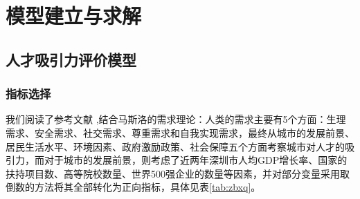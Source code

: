 \documentclass[withoutpreface,bwprint]{cumcmthesis} %
\newcommand{\upcite}[1]{\textsuperscript{\textsuperscript{\cite{#1}}}}
\begin{document}
\section{模型建立与求解}
\subsection{人才吸引力评价模型}
\subsubsection{指标选择}
我们阅读了参考文献\upcite{bib:1} ,结合马斯洛的需求理论：人类的需求主要有5个方面：生理需求、安全需求、社交需求、尊重需求和自我实现需求，最终从城市的发展前景、居民生活水平、环境因素、政府激励政策、社会保障五个方面考察城市对人才的吸引力，而对于城市的发展前景，则考虑了近两年深圳市人均GDP增长率、国家的扶持项目数、高等院校数量、世界500强企业的数量等因素，并对部分变量采用取倒数的方法将其全部转化为正向指标，具体见表\ref{tab:zbxq}。

\linespread{0.5}
\end{document}
